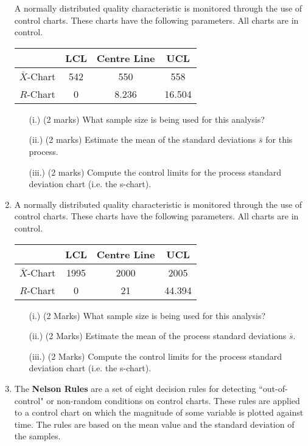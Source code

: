 \documentclass[a4paper,12pt]{article}
\begin{document}
\begin{enumerate}
A normally distributed quality characteristic is monitored through the use of control charts. These charts have the following parameters. All charts are in control.
\begin{center}
	\begin{tabular}{|c|c|c|c|}
		\hline  & LCL & Centre Line & UCL \\
		\hline $\bar{X}$-Chart & 542 & 550 & 558 \\
		\hline $R$-Chart & 0 & 8.236 & 16.504 \\ \hline
	\end{tabular}
\end{center}

\begin{itemize}
	\item[(i.)] (2 marks) What sample size is being used for this analysis?
	\item[(ii.)](2 marks) Estimate the mean of the standard deviations $\bar{s}$ for this process.
	\item[(iii.)] (2 marks) Compute the control limits for the process standard deviation chart (i.e. the s-chart).
\end{itemize}

\item A normally distributed quality characteristic is monitored through the use of control charts. These charts have the following parameters. All charts are in control.
\begin{center}
	\begin{tabular}{|c|c|c|c|}
		\hline  & LCL & Centre Line & UCL \\
		\hline $\bar{X}$-Chart & 1995 & 2000 & 2005 \\
		\hline $R$-Chart & 0 & 21 & 44.394 \\ \hline
	\end{tabular}
\end{center}

\begin{itemize}
	\item[(i.)] (2 Marks) What sample size is being used for this analysis?
	\item[(ii.)] (2 Marks) Estimate the mean of the process standard deviations $\bar{s}$.
	\item[(iii.)] (2 Marks) Compute the control limits for the process standard deviation chart (i.e. the s-chart).
\end{itemize}


\item 
The \textbf{Nelson Rules} are a set of eight decision rules for detecting ``out-of-control" or non-random conditions on control charts. These rules are applied to a control chart on which the magnitude of some variable is plotted against time. The rules are based on the mean value and the standard deviation of the samples.\\


\end{enumerate}
\end{document}
